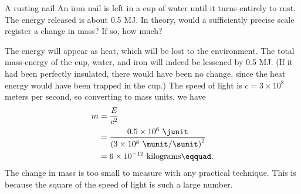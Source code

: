 \begin{eg}{A rusting nail}\label{eg:rustingnail}
\egquestion
An iron nail is left in a cup of water
until it turns entirely to rust. The energy released is
about 0.5 MJ. In theory, would a sufficiently
precise scale register a change in mass? If so, how much?

\eganswer
 The energy will appear as heat, which will be lost
to the environment. The total mass-energy of the cup,
water, and iron will indeed be lessened by 0.5 MJ. (If it
had been perfectly insulated, there would have been no
change, since the heat energy would have been trapped in the
cup.) The speed of light is
$c=3\times10^8$ meters per second, so converting to mass units, we have
\begin{align*}
                m         &=    \frac{E}{c^2}  \\
                        &= \frac{0.5\times10^6\ \junit}{\left(3\times10^8\ \munit/\sunit\right)^2} \\
                         &=    6\times10^{-12}\  \text{kilograms}\eqquad.
\end{align*}
The change in mass is too small to measure with any
practical technique. This is because the square of the speed
of light is such a large number.
\end{eg}

